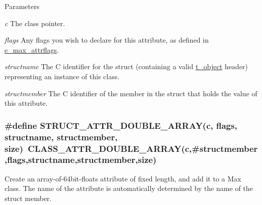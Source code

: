 \begin{DoxyParams}{Parameters}
\item[{\em c}]The class pointer. \item[{\em flags}]Any flags you wish to declare for this attribute, as defined in \hyperlink{group__attr_gaf296cfc6741bb19207f6ed8062809115}{e\_\-max\_\-attrflags}. \item[{\em structname}]The C identifier for the struct (containing a valid \hyperlink{structt__object}{t\_\-object} header) representing an instance of this class. \item[{\em structmember}]The C identifier of the member in the struct that holds the value of this attribute. \end{DoxyParams}
\hypertarget{group__attr_ga4bef3fbaa0403c2f9eefa942ffc8b00f}{
\subsubsection[{STRUCT\_\-ATTR\_\-DOUBLE\_\-ARRAY}]{\setlength{\rightskip}{0pt plus 5cm}\#define STRUCT\_\-ATTR\_\-DOUBLE\_\-ARRAY(c, \/  flags, \/  structname, \/  structmember, \/  size)~CLASS\_\-ATTR\_\-DOUBLE\_\-ARRAY(c,\#structmember,flags,structname,structmember,size)}}
\label{group__attr_ga4bef3fbaa0403c2f9eefa942ffc8b00f}


Create an array-\/of-\/64bit-\/floats attribute of fixed length, and add it to a Max class. The name of the attribute is automatically determined by the name of the struct member.


